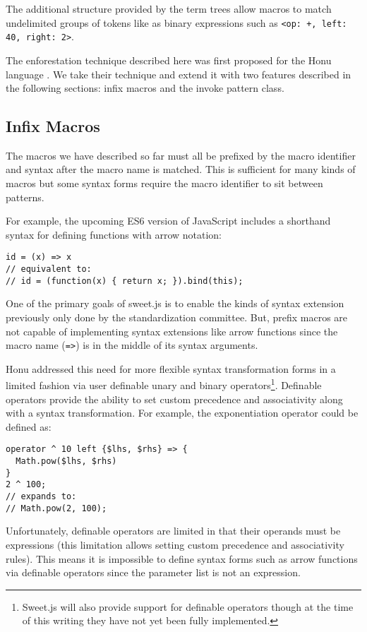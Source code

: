 \documentclass[preprint,10pt]{sigplanconf}
\begin{document}
The additional structure provided by the term trees allow macros to
match undelimited groups of tokens like as binary expressions such as
\lstinline!<op: +, left: 40, right: 2>!.

The enforestation technique described here was first proposed for the
Honu language \cite{Rafkind2013}. We take their technique and extend
it with two features described in the following sections:
infix macros and the invoke pattern class.

\subsection{Infix Macros}
\label{sec:infix}
The macros we have described so far must all be prefixed by the macro
identifier and syntax after the macro name is matched. This is
sufficient for many kinds of macros but some syntax forms require the
macro identifier to sit between patterns.

For example, the upcoming ES6 version of JavaScript includes a
shorthand syntax for defining functions with arrow notation:

\begin{lstlisting}
id = (x) => x
// equivalent to:
// id = (function(x) { return x; }).bind(this);
\end{lstlisting}

One of the primary goals of sweet.js is to enable the kinds of syntax
extension previously only done by the standardization committee. But,
prefix macros are not capable of implementing syntax extensions like
arrow functions since the macro name (\lstinline!=>!) is in the middle
of its syntax arguments.

Honu addressed this need for more flexible syntax transformation forms
in a limited fashion via user definable unary and binary
operators\footnote{Sweet.js will also provide support for definable
  operators though at the time of this writing they have not yet been
  fully implemented.}. Definable operators provide the ability to set
custom precedence and associativity along with a syntax
transformation. For example, the exponentiation operator could be
defined as:
\begin{lstlisting}
operator ^ 10 left {$lhs, $rhs} => {
  Math.pow($lhs, $rhs)
}
2 ^ 100;
// expands to:
// Math.pow(2, 100);
\end{lstlisting}

Unfortunately, definable operators are limited in that their operands
must be expressions (this limitation allows setting custom precedence
and associativity rules). This means it is impossible to define syntax
forms such as arrow functions via definable operators since the
parameter list is not an expression.
\end{document}
